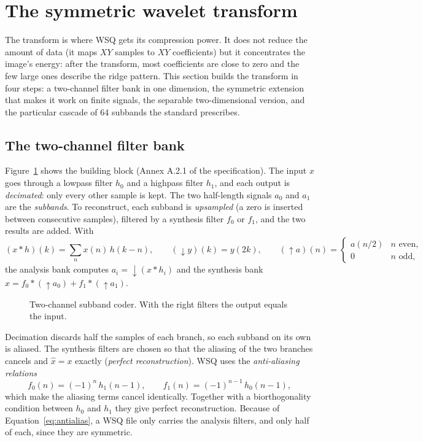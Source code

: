 \section{The symmetric wavelet transform}
\label{sec:transform}

The transform is where WSQ gets its compression power. It does not reduce the amount of data
(it maps $XY$ samples to $XY$ coefficients) but it concentrates the image's energy: after the
transform, most coefficients are close to zero and the few large ones describe the ridge
pattern. This section builds the transform in four steps: a two-channel filter bank in one
dimension, the symmetric extension that makes it work on finite signals, the separable
two-dimensional version, and the particular cascade of 64 subbands the standard prescribes.

\subsection{The two-channel filter bank}

Figure~\ref{fig:filterbank} shows the building block (Annex A.2.1 of the specification). The
input $x$ goes through a lowpass filter $h_0$ and a highpass filter $h_1$, and each output is
\emph{decimated}: only every other sample is kept. The two half-length signals $a_0$ and $a_1$
are the \emph{subbands}. To reconstruct, each subband is \emph{upsampled} (a zero is inserted
between consecutive samples), filtered by a synthesis filter $f_0$ or $f_1$, and the two results
are added. With
\begin{equation*}
  (x * h)(k) = \sum_{n} x(n)\,h(k-n), \qquad
  ({\downarrow} y)(k) = y(2k), \qquad
  ({\uparrow} a)(n) = \begin{cases} a(n/2) & n \text{ even},\\ 0 & n \text{ odd},\end{cases}
\end{equation*}
the analysis bank computes $a_i = {\downarrow}(x * h_i)$ and the synthesis bank
$\hat x = f_0 * ({\uparrow} a_0) + f_1 * ({\uparrow} a_1)$.

\begin{figure}[ht]
  \centering
  
  \caption{Two-channel subband coder. With the right filters the output equals the input.}
  \label{fig:filterbank}
\end{figure}

Decimation discards half the samples of each branch, so each subband on its own is aliased.
The synthesis filters are chosen so that the aliasing of the two branches cancels and
$\hat x = x$ exactly (\emph{perfect reconstruction}). WSQ uses the \emph{anti-aliasing
relations}
\begin{equation}
  f_0(n) = (-1)^n\, h_1(n-1), \qquad f_1(n) = (-1)^{n-1}\, h_0(n-1),
  \label{eq:antialias}
\end{equation}
which make the aliasing terms cancel identically. Together with a biorthogonality condition
between $h_0$ and $h_1$ they give perfect reconstruction. Because of
Equation~\eqref{eq:antialias}, a WSQ file only carries the analysis filters, and only half of
each, since they are symmetric.

